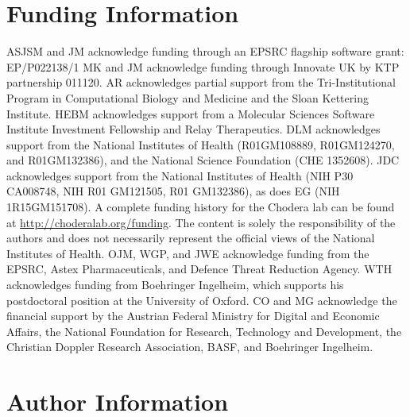 \documentclass[9pt,bestpractices]{livecoms}
\begin{document}
\section*{Funding Information}
ASJSM and JM acknowledge funding through an EPSRC flagship software grant: EP/P022138/1
MK and JM acknowledge funding through Innovate UK by KTP partnership 011120.
AR acknowledges partial support from the Tri-Institutional Program in Computational Biology and Medicine and the Sloan Kettering Institute.
HEBM acknowledges support from a Molecular Sciences Software Institute Investment Fellowship and Relay Therapeutics.
DLM acknowledges support from the National Institutes of Health (R01GM108889, R01GM124270, and R01GM132386), and the National Science Foundation (CHE 1352608).
JDC acknowledges support from the National Institutes of Health (NIH P30 CA008748, NIH R01 GM121505, R01 GM132386), as does EG (NIH 1R15GM151708).
A complete funding history for the Chodera lab can be found at \url{http://choderalab.org/funding}.
The content is solely the responsibility of the authors and does not necessarily represent the official views of the National Institutes of Health.
OJM, WGP, and JWE acknowledge funding from the EPSRC, Astex Pharmaceuticals, and Defence Threat Reduction Agency.
WTH acknowledges funding from Boehringer Ingelheim, which supports his postdoctoral position at the University of Oxford.
CO and MG acknowledge the financial support by the Austrian Federal Ministry for Digital and Economic Affairs, the National Foundation for Research, Technology and Development, the Christian Doppler Research Association, BASF, and Boehringer Ingelheim.


\section*{Author Information}
\makeorcid



\end{document}
